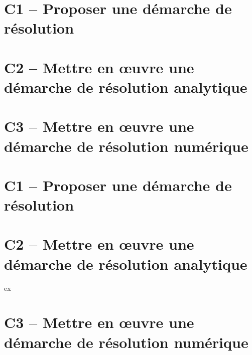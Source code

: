
\proffalse

\section{C1 -- Proposer une démarche de résolution}
\begin{multicols}{2}


\end{multicols}

\section{C2 -- Mettre en œuvre une démarche de résolution analytique}
\begin{multicols}{2}









\end{multicols}


\section{C3 -- Mettre en œuvre une démarche de résolution numérique}
\begin{multicols}{2}
\end{multicols}

\newpage
\proftrue
\section{C1 -- Proposer une démarche de résolution}





\section{C2 -- Mettre en œuvre une démarche de résolution analytique}









ex



\section{C3 -- Mettre en œuvre une démarche de résolution numérique}

